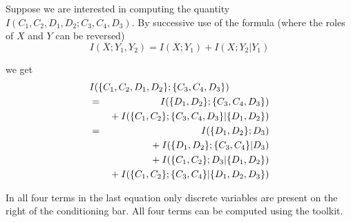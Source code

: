 \documentclass{article}
\begin{document}
Suppose we are interested in computing the quantity
$I({C_1,C_2,D_1,D_2};{C_3,C_4,D_3} )$.  By successive use of the
formula (where the roles of $X$ and $Y$ can be reversed)
\begin{equation}
I(X;Y_1,Y_2)= I(X;Y_1) +I(X;Y_2|Y_1)
\end{equation}

we get
\begin{eqnarray*}
\lefteqn{I(\{C_1,C_2,D_1,D_2\};\{C_3,C_4,D_3\} )} \\ 
&=& I(\{D_1,D_2\};\{C_3,C_4,D_3\}) \\
& & \mbox{} + I(\{C_1,C_2\};\{C_3,C_4,D_3\}|\{D_1,D_2\}) \\
&=& I(\{D_1,D_2\};D_3) \\
& & \mbox{} + I(\{D_1,D_2\};\{C_3,C_4\}|D_3) \\
& & \mbox{} + I(\{C_1,C_2\};D_3|\{D_1,D_2\}) \\
& & \mbox{} + I(\{C_1,C_2\};\{C_3,C_4\}|\{D_1,D_2,D_3\})
\end{eqnarray*}

In all four terms in the last equation only discrete variables are
present on the right of the conditioning bar.  All four terms can
be computed using the toolkit.



\end{document}
